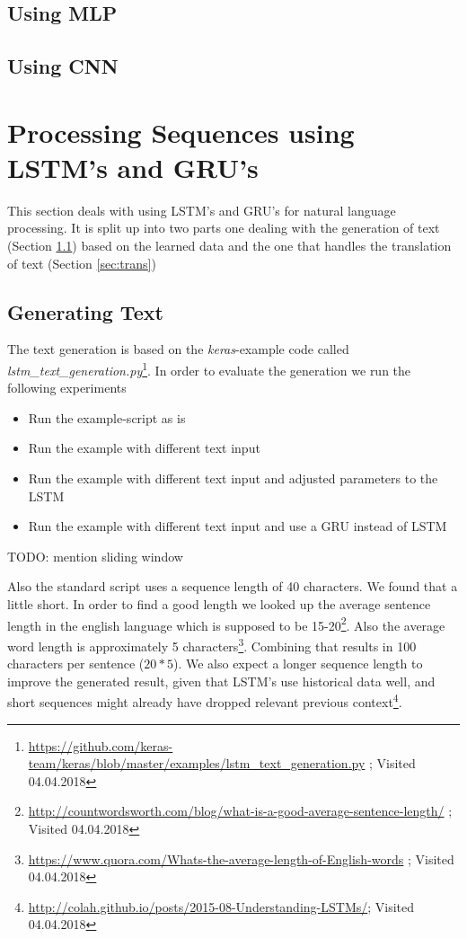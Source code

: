 \documentclass{article}
\begin{document}
\subsection{Using MLP}


\subsection{Using CNN}



\section{Processing Sequences using LSTM's and GRU's}
\label{sec:seq}
This section deals with using LSTM's and GRU's for natural language processing.
It is split up into two parts one dealing with the generation of text (Section \ref{sec:gen}) based on the learned data and the one that handles the translation of text (Section \ref{sec:trans})
\subsection{Generating Text}
\label{sec:gen}
The text generation is based on the \textit{keras}-example code called \textit{lstm\_text\_generation.py}\footnote{\url{https://github.com/keras-team/keras/blob/master/examples/lstm_text_generation.py} ; Visited 04.04.2018}.
In order to evaluate the generation we run the following experiments
\begin{itemize}
\item{Run the example-script as is}
\item{Run the example with different text input}
\item{Run the example with different text input and adjusted parameters to the LSTM}
\item{Run the example with different text input and use a GRU instead of LSTM}
\end{itemize}


TODO: mention sliding window


Also the standard script uses a sequence length of 40 characters. We found that a little short. In order to find a good length we looked up the average sentence length in the english language which is supposed to be 15-20\footnote{\url{http://countwordsworth.com/blog/what-is-a-good-average-sentence-length/} ; Visited 04.04.2018}.
Also the average word length is approximately 5 characters\footnote{\url{https://www.quora.com/Whats-the-average-length-of-English-words} ; Visited 04.04.2018}. Combining that results in 100 characters per sentence ($20 * 5$). We also expect a longer sequence length to improve the generated result, given that LSTM's use historical data well, and short sequences might already have dropped relevant previous context\footnote{\url{http://colah.github.io/posts/2015-08-Understanding-LSTMs/}; Visited 04.04.2018}.
\end{document}
